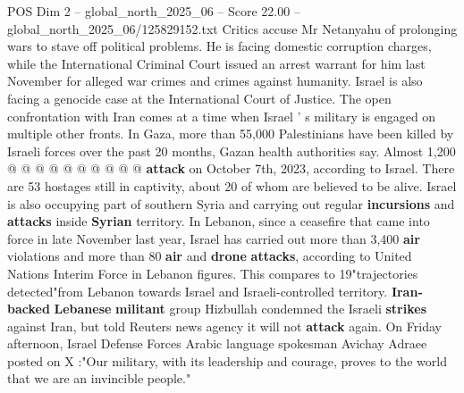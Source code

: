 \begin{textsample}{POS Dim 2 – global\_north\_2025\_06 – Score 22.00 – global\_north\_2025\_06/125829152.txt}
Critics accuse Mr Netanyahu of prolonging wars to stave off political problems.
He is facing domestic corruption charges, while the International Criminal Court issued an arrest warrant for him last November for alleged war crimes and crimes against humanity.
Israel is also facing a genocide case at the International Court of Justice.
The open confrontation with Iran comes at a time when Israel ' s military is engaged on multiple other fronts.
In Gaza, more than 55,000 Palestinians have been killed by Israeli forces over the past 20 months, Gazan health authorities say.
Almost 1,200 @ @ @ @ @ @ @ @ @ @ \textbf{attack} on October 7th, 2023, according to Israel.
There are 53 hostages still in captivity, about 20 of whom are believed to be alive.
Israel is also occupying part of southern Syria and carrying out regular \textbf{incursions} and \textbf{attacks} inside \textbf{Syrian} territory.
In Lebanon, since a ceasefire that came into force in late November last year, Israel has carried out more than 3,400 \textbf{air} violations and more than 80 \textbf{air} and \textbf{drone} \textbf{attacks}, according to United Nations Interim Force in Lebanon figures.
This compares to 19"trajectories detected"from Lebanon towards Israel and Israeli-controlled territory. \textbf{Iran-backed} \textbf{Lebanese} \textbf{militant} group Hizbullah condemned the Israeli \textbf{strikes} against Iran, but told Reuters news agency it will not \textbf{attack} again.
On Friday afternoon, Israel Defense Forces Arabic language spokesman Avichay Adraee posted on X :"Our military, with its leadership and courage, proves to the world that we are an invincible people."

\end{textsample}
